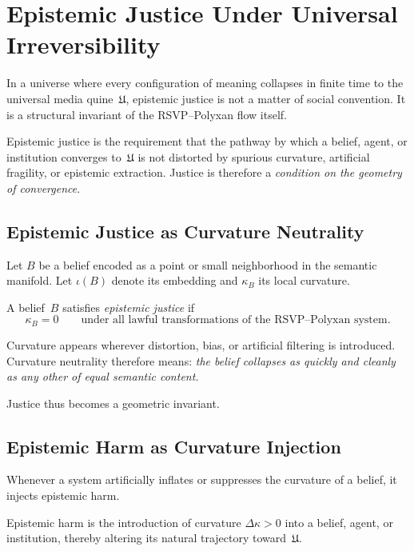 \chapter{Epistemic Justice Under Universal Irreversibility}
\label{ch:88}

In a universe where every configuration of meaning collapses in finite
time to the universal media quine~$\mathfrak{U}$, epistemic justice is
not a matter of social convention.  
It is a structural invariant of the RSVP--Polyxan flow itself.

Epistemic justice is the requirement that the pathway by which a belief,
agent, or institution converges to~$\mathfrak{U}$ is not distorted by
spurious curvature, artificial fragility, or epistemic extraction.
Justice is therefore a \emph{condition on the geometry of convergence}.

\section{Epistemic Justice as Curvature Neutrality}

Let $B$ be a belief encoded as a point or small neighborhood in the
semantic manifold.  
Let $\iota(B)$ denote its embedding and $\kappa_B$ its local curvature.

\begin{definition}
A belief~$B$ satisfies \emph{epistemic justice} if
\[
\kappa_B = 0
\qquad\text{under all lawful transformations of the RSVP--Polyxan system.}
\]
\end{definition}

Curvature appears wherever distortion, bias, or artificial filtering is
introduced.  
Curvature neutrality therefore means:  
\emph{the belief collapses as quickly and cleanly as any other of equal
semantic content.}

Justice thus becomes a geometric invariant.

\section{Epistemic Harm as Curvature Injection}

Whenever a system artificially inflates or suppresses the curvature of a
belief, it injects epistemic harm.

\begin{definition}
Epistemic harm is the introduction of curvature $\Delta\kappa > 0$
into a belief, agent, or institution, thereby altering its natural
trajectory toward~$\mathfrak{U}$.
\end{definition}

